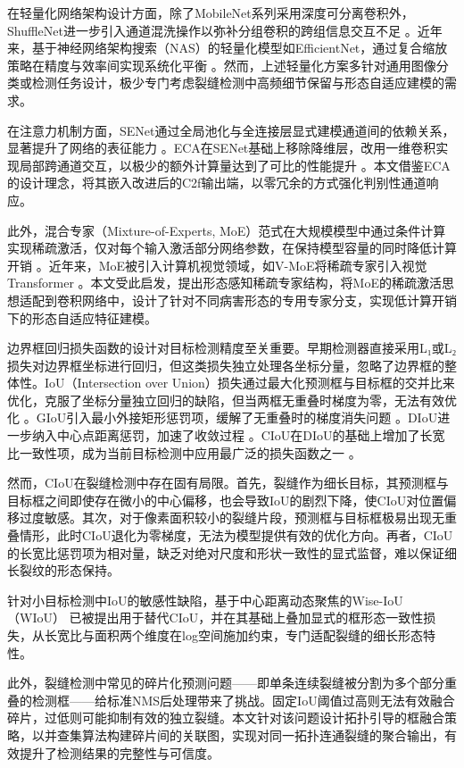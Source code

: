 \documentclass[twocolumn]{sn-jnl}
\begin{document}
在轻量化网络架构设计方面，除了MobileNet系列采用深度可分离卷积外，ShuffleNet进一步引入通道混洗操作以弥补分组卷积的跨组信息交互不足 \cite{Zhang2018}。近年来，基于神经网络架构搜索（NAS）的轻量化模型如EfficientNet，通过复合缩放策略在精度与效率间实现系统化平衡 \cite{Tan2019}。然而，上述轻量化方案多针对通用图像分类或检测任务设计，极少专门考虑裂缝检测中高频细节保留与形态自适应建模的需求。

在注意力机制方面，SENet通过全局池化与全连接层显式建模通道间的依赖关系，显著提升了网络的表征能力 \cite{Hu2018}。ECA在SENet基础上移除降维层，改用一维卷积实现局部跨通道交互，以极少的额外计算量达到了可比的性能提升 \cite{Wang2020}。本文借鉴ECA的设计理念，将其嵌入改进后的C2f输出端，以零冗余的方式强化判别性通道响应。

此外，混合专家（Mixture-of-Experts, MoE）范式在大规模模型中通过条件计算实现稀疏激活，仅对每个输入激活部分网络参数，在保持模型容量的同时降低计算开销 \cite{Shazeer2017}。近年来，MoE被引入计算机视觉领域，如V-MoE将稀疏专家引入视觉Transformer \cite{Riquelme2021}。本文受此启发，提出形态感知稀疏专家结构，将MoE的稀疏激活思想适配到卷积网络中，设计了针对不同病害形态的专用专家分支，实现低计算开销下的形态自适应特征建模。

边界框回归损失函数的设计对目标检测精度至关重要。早期检测器直接采用L₁或L₂损失对边界框坐标进行回归，但这类损失独立处理各坐标分量，忽略了边界框的整体性。IoU（Intersection over Union）损失通过最大化预测框与目标框的交并比来优化，克服了坐标分量独立回归的缺陷，但当两框无重叠时梯度为零，无法有效优化 \cite{Yu2016}。GIoU引入最小外接矩形惩罚项，缓解了无重叠时的梯度消失问题 \cite{Rezatofighi2019}。DIoU进一步纳入中心点距离惩罚，加速了收敛过程 \cite{Zheng2020}。CIoU在DIoU的基础上增加了长宽比一致性项，成为当前目标检测中应用最广泛的损失函数之一 \cite{Zheng2020}。

然而，CIoU在裂缝检测中存在固有局限。首先，裂缝作为细长目标，其预测框与目标框之间即使存在微小的中心偏移，也会导致IoU的剧烈下降，使CIoU对位置偏移过度敏感。其次，对于像素面积较小的裂缝片段，预测框与目标框极易出现无重叠情形，此时CIoU退化为零梯度，无法为模型提供有效的优化方向。再者，CIoU的长宽比惩罚项为相对量，缺乏对绝对尺度和形状一致性的显式监督，难以保证细长裂纹的形态保持。

针对小目标检测中IoU的敏感性缺陷，基于中心距离动态聚焦的Wise-IoU（WIoU）\cite{Sui2022} 已被提出用于替代CIoU，并在其基础上叠加显式的框形态一致性损失，从长宽比与面积两个维度在log空间施加约束，专门适配裂缝的细长形态特性。

此外，裂缝检测中常见的碎片化预测问题——即单条连续裂缝被分割为多个部分重叠的检测框——给标准NMS后处理带来了挑战。固定IoU阈值过高则无法有效融合碎片，过低则可能抑制有效的独立裂缝。本文针对该问题设计拓扑引导的框融合策略，以并查集算法构建碎片间的关联图，实现对同一拓扑连通裂缝的聚合输出，有效提升了检测结果的完整性与可信度。
\end{document}
